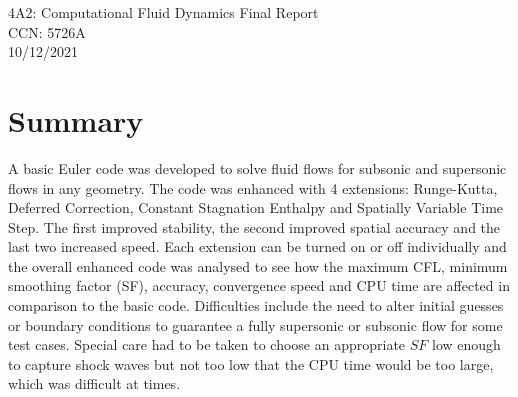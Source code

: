 \documentclass[12pt, a4paper]{article}
\begin{document}

\begingroup  
\centering
\LARGE 4A2: Computational Fluid Dynamics Final Report\\[1em]
\large CCN: 5726A \\
\large 10/12/2021 \\
\endgroup

\section{Summary}
A basic Euler code was developed to solve fluid flows for subsonic and supersonic flows in any geometry. The code was enhanced with 4 extensions: Runge-Kutta, Deferred Correction, Constant Stagnation Enthalpy and Spatially Variable Time Step. The first improved stability, the second improved spatial accuracy and the last two increased speed. Each extension can be turned on or off individually and the overall enhanced code was analysed to see how the maximum CFL, minimum smoothing factor (SF), accuracy, convergence speed and CPU time are affected in comparison to the basic code. Difficulties include the need to alter initial guesses or boundary conditions to guarantee a fully supersonic or subsonic flow for some test cases. Special care had to be taken to choose an appropriate $SF$ low enough to capture shock waves but not too low that the CPU time would be too large, which was difficult at times.
\end{document}
